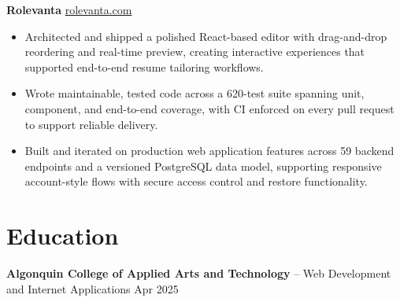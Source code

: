 \documentclass[11pt]{article}       %
\begin{document}
\textbf{Rolevanta} \hfill \href{https://rolevanta.com}{rolevanta.com} \\
\vspace{-9pt}
\begin{itemize}
  \item Architected and shipped a polished React-based editor with drag-and-drop reordering and real-time preview, creating interactive experiences that supported end-to-end resume tailoring workflows.
  \item Wrote maintainable, tested code across a 620-test suite spanning unit, component, and end-to-end coverage, with CI enforced on every pull request to support reliable delivery.
  \item Built and iterated on production web application features across 59 backend endpoints and a versioned PostgreSQL data model, supporting responsive account-style flows with secure access control and restore functionality.
\end{itemize}





\section*{Education}
\textbf{Algonquin College of Applied Arts and Technology} -- Web Development and Internet Applications
\hfill Apr 2025 \\
\end{document}

